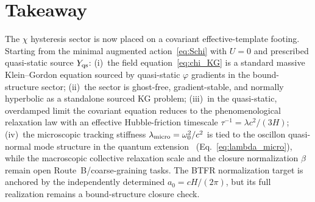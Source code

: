 \documentclass[11pt]{article}
\begin{document}
\section*{Takeaway}
The $\chi$ hysteresis sector is now placed on a
covariant effective-template footing.  Starting from the minimal
augmented action~\eqref{eq:Schi} with $U = 0$ and prescribed
quasi-static source $Y_{\rm qs}$:
(i)~the field equation~\eqref{eq:chi_KG} is a standard
massive Klein--Gordon equation sourced by quasi-static $\varphi$
gradients in the bound-structure sector;
(ii)~the sector is ghost-free, gradient-stable,
and normally hyperbolic as a standalone sourced KG problem;
(iii)~in the quasi-static, overdamped limit the
covariant equation reduces to the phenomenological
relaxation law with an effective Hubble-friction timescale
$\tau^{-1} = \lambda c^2/(3H)$;
(iv)~the microscopic tracking stiffness
$\lambda_{\rm micro} = \omega_0^2/c^2$ is tied to the oscillon
quasi-normal mode structure in the quantum
extension~\cite{Lotishvili2026Q}
(Eq.~\ref{eq:lambda_micro}), while the macroscopic collective
relaxation scale and the closure normalization $\beta$ remain open
Route~B/coarse-graining tasks.  The BTFR normalization target is
anchored by the independently determined $a_0 = cH/(2\pi)$, but its
full realization remains a bound-structure closure check.
\end{document}
